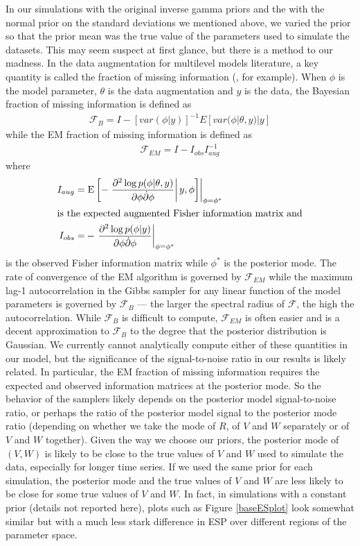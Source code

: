 \documentclass{article}
\begin{document}
 
In our simulations with the original inverse gamma priors and the with the normal prior on the standard deviations we mentioned above, we varied the prior so that the prior mean was the true value of the parameters used to simulate the datasets. This may seem suspect at first glance, but there is a method to our madness. In the data augmentation for multilevel models literature, a key quantity is called the fraction of missing information (\citet{van2001art}, for example). When $\phi$ is the model parameter, $\theta$ is the data augmentation and $y$ is the data, the Bayesian fraction of missing information is defined as
\begin{align*}
  \mathcal{F}_B = I - [var(\phi|y)]^{-1}E[var(\phi|\theta,y)|y]
\end{align*}
while the EM fraction of missing information is defined as
\begin{align*}
  \mathcal{F}_{EM} = I - I_{obs}I_{aug}^{-1}
\end{align*}
where 
\begin{align*}
  I_{aug}=& \left.\mathrm{E} \left[-\left.\frac{\partial^2 \log p(\phi|\theta,y)}{\partial \phi \dot \partial \phi}\right| y,\phi\right]\right|_{\phi=\phi^*}\\
  \intertext{is the expected augmented Fisher information matrix and}
  I_{obs} =& -\left.\frac{\partial^2\log p(\phi|y)}{\partial\phi \dot \partial\phi}\right|_{\phi=\phi^*}
\end{align*}
is the observed Fisher information matrix while $\phi^*$ is the posterior mode. The rate of convergence of the EM algorithm is governed by $\mathcal{F}_{EM}$ while the maximum lag-1 autocorrelation in the Gibbs sampler for any linear function of the model parameters is governed by $\mathcal{F}_{B}$ --- the larger the spectral radius of $\mathcal{F}$, the high the autocorrelation. While $\mathcal{F}_{B}$ is difficult to compute, $\mathcal{F}_{EM}$ is often easier and is a decent approximation to $\mathcal{F}_{B}$ to the degree that the posterior distribution is Gaussian. We currently cannot analytically compute either of these quantities in our model, but the significance of the signal-to-noise ratio in our results is likely related. In particular, the EM fraction of missing information requires the expected and observed information matrices at the posterior mode. So the behavior of the samplers likely depends on the posterior model signal-to-noise ratio, or perhaps the ratio of the posterior model signal to the posterior mode ratio (depending on whether we take the mode of $R$, of $V$ and $W$ separately or of $V$ and $W$ together). Given the way we choose our priors, the posterior mode of $(V,W)$ is likely to be close to the true values of $V$ and $W$ used to simulate the data, especially for longer time series. If we used the same prior for each simulation, the posterior mode and the true values of $V$ and $W$ are less likely to be close for some true values of $V$ and $W$. In fact, in simulations with a constant prior (details not reported here), plots such as Figure \ref{baseESplot} look somewhat similar but with a much less stark difference in ESP over different regions of the parameter space.
\end{document}
